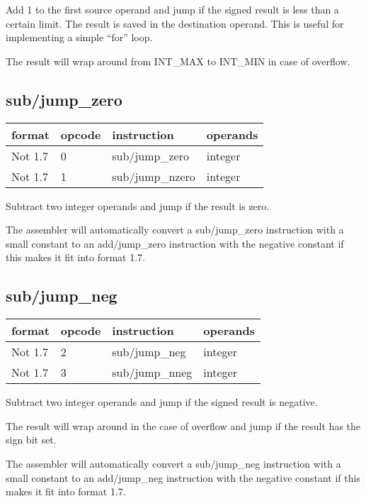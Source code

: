\documentclass[forwardcom.tex]{subfiles}
\begin{document}
Add 1 to the first source operand and jump if the signed result is less than a certain limit. The result is saved in the destination operand. This is useful for implementing a simple ``for'' loop.
\vv

The result will wrap around from INT\_MAX to INT\_MIN in case of overflow. 
\vv


\subsection{sub/jump\_zero}
\label{table:subJumpZeroInstruction}
\begin{tabular}{|p{20mm}|p{12mm}|p{56mm}|p{50mm}|}
\hline
\bfseries format & \bfseries opcode & \bfseries instruction & \bfseries operands \\ \hline
Not 1.7 &  0 & sub/jump\_zero & integer \\ \hline
Not 1.7 &  1 & sub/jump\_nzero  & integer\\ \hline
\end{tabular}
\vv

Subtract two integer operands and jump if the result is zero.
\vv

The assembler will automatically convert a sub/jump\_zero instruction with a small constant to an add/jump\_zero instruction with the negative constant if this makes it fit into format 1.7. 
\vv

\subsection{sub/jump\_neg}
\label{table:subJumpNegInstruction}
\begin{tabular}{|p{20mm}|p{12mm}|p{56mm}|p{50mm}|}
\hline
\bfseries format & \bfseries opcode & \bfseries instruction & \bfseries operands \\ \hline
Not 1.7 &  2 & sub/jump\_neg & integer \\ \hline
Not 1.7 &  3 & sub/jump\_nneg & integer\\ \hline
\end{tabular}
\vv

Subtract two integer operands and jump if the signed result is negative.

The result will wrap around in the case of overflow and jump if the result has the sign bit set.
\vv

The assembler will automatically convert a sub/jump\_neg instruction with a small constant to an add/jump\_neg instruction with the negative constant if this makes it fit into format 1.7.
\vv
\end{document}
